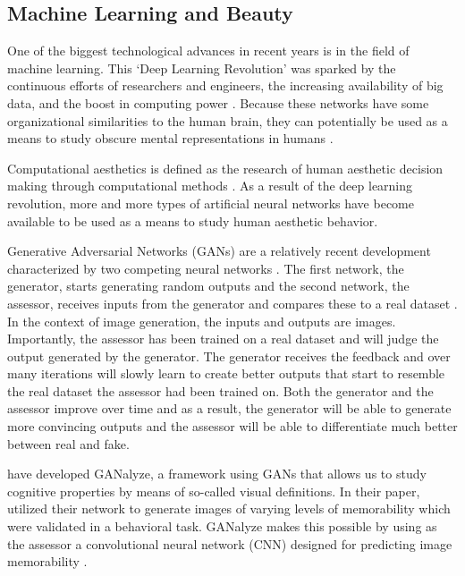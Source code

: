 \documentclass[../main.tex]{subfiles}
\begin{document}
\subsection{Machine Learning and Beauty}
One of the biggest technological advances in recent years is in the field of machine learning. This `Deep Learning Revolution' was sparked by the continuous efforts of researchers and engineers, the increasing availability of big data, and the boost in computing power \parencite{sejnowskiDeepLearningRevolution2018}. Because these networks have some organizational similarities to the human brain, they can potentially be used as a means to study obscure mental representations in humans \parencite{guoDeepLearningVisual2016, goetschalckx2021generative}. 

Computational aesthetics is defined as the research of human aesthetic decision making through computational methods \parencite{valenziseAdvancesChallengesComputational2022, hoenig2005proceedings}. As a result of the deep learning revolution, more and more types of artificial neural networks have become available to be used as a means to study human aesthetic behavior.

Generative Adversarial Networks (GANs) are a relatively recent development characterized by two competing neural networks \parencite{goodfellow2014generative}. The first network, the generator, starts generating random outputs and the second network, the assessor, receives inputs from the generator and compares these to a real dataset \parencite{creswellGenerativeAdversarialNetworks2018}. In the context of image generation, the inputs and outputs are images. Importantly, the assessor has been trained on a real dataset and will judge the output generated by the generator. The generator receives the feedback and over many iterations will slowly learn to create better outputs that start to resemble the real dataset the assessor had been trained on. Both the generator and the assessor improve over time and as a result, the generator will be able to generate more convincing outputs and the assessor will be able to differentiate much better between real and fake.


\textcite{goetschalckxGANalyzeVisualDefinitions2019} have developed GANalyze, a framework using GANs that allows us to study cognitive properties by means of so-called visual definitions. In their paper, \textcite{goetschalckxGANalyzeVisualDefinitions2019} utilized their network to generate images of varying levels of memorability which were validated in a behavioral task. GANalyze makes this possible by using as the assessor a convolutional neural network (CNN) designed for predicting image memorability \parencite{khosla2015understanding}.
\end{document}

